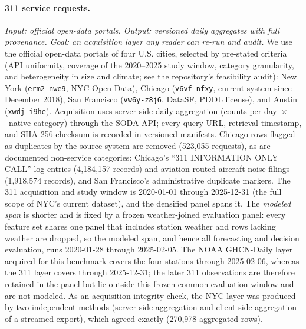 \paragraph{311 service requests.}
\emph{Input: official open-data portals. Output: versioned daily
aggregates with full provenance. Goal: an acquisition layer any reader
can re-run and audit.}
We use the official open-data portals of four U.S. cities, selected by
pre-stated criteria (API uniformity, coverage of the 2020--2025 study
window, category granularity, and heterogeneity in size and climate;
see the repository's feasibility audit): New York (\texttt{erm2-nwe9}, NYC Open
Data), Chicago (\texttt{v6vf-nfxy}, current system since December 2018), San Francisco (\texttt{vw6y-z8j6}, DataSF, PDDL license),
and Austin (\texttt{xwdj-i9he}). Acquisition uses server-side daily
aggregation (counts per day~$\times$~native category) through the SODA
API; every query URL, retrieval timestamp, and SHA-256 checksum is
recorded in versioned manifests. Chicago rows flagged as duplicates by the
source system are removed (523{,}055 requests), as are documented
non-service categories: Chicago's ``311 INFORMATION ONLY CALL'' log
entries (4{,}184{,}157 records) and aviation-routed aircraft-noise filings
(1{,}918{,}574 records), and San Francisco's administrative duplicate
markers. The 311 acquisition and study window is 2020-01-01 through
2025-12-31 (the full scope of NYC's current dataset), and the densified
panel spans it. The \emph{modeled span} is shorter and is fixed
by a frozen weather-joined evaluation panel: every feature set shares one
panel that includes station weather and rows lacking weather are dropped,
so the modeled span, and hence all forecasting and decision
evaluation, runs 2020-01-28 through 2025-02-05. The NOAA GHCN-Daily layer acquired
for this benchmark covers the four stations through 2025-02-06, whereas the
311 layer covers through 2025-12-31; the later 311 observations are
therefore retained in the panel but lie outside this frozen common
evaluation window and are not modeled. As an acquisition-integrity check, the
NYC layer was produced by two independent methods (server-side
aggregation and client-side aggregation of a streamed export), which
agreed exactly (270{,}978 aggregated rows).


